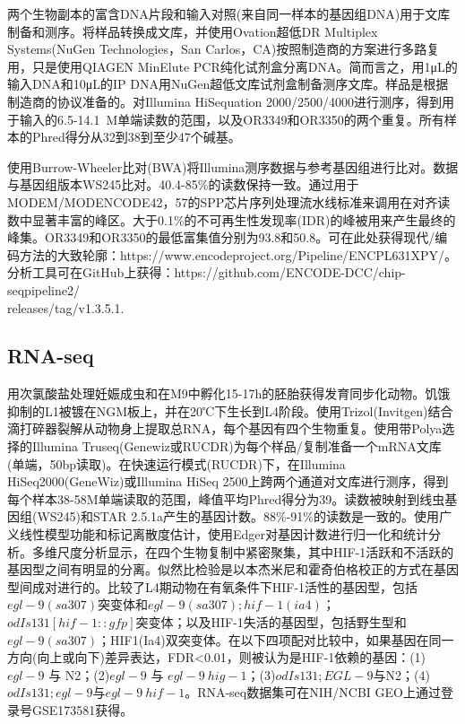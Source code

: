 \documentclass{ctexart}
\begin{document}
        两个生物副本的富含DNA片段和输入对照(来自同一样本的基因组DNA)用于文库制备和测序。将样品转换成文库，并使用Ovation超低DR Multiplex Systems(NuGen Technologies，San Carlos，CA)按照制造商的方案进行多路复用，只是使用QIAGEN MinElute PCR纯化试剂盒分离DNA。简而言之，用1μL的输入DNA和10μL的IP DNA用NuGen超低文库试剂盒制备测序文库。样品是根据制造商的协议准备的。对Illumina HiSequation 2000/2500/4000进行测序，得到用于输入的6.5-14.1~M单端读数的范围，以及OR3349和OR3350的两个重复。所有样本的Phred得分从32到38到至少47个碱基。

        使用Burrow-Wheeler比对(BWA)将Illumina测序数据与参考基因组进行比对。数据与基因组版本WS245比对。40.4-85\%的读数保持一致。通过用于MODEM/MODENCODE42，57的SPP芯片序列处理流水线标准来调用在对齐读数中显著丰富的峰区。大于0.1\%的不可再生性发现率(IDR)的峰被用来产生最终的峰集。OR3349和OR3350的最低富集值分别为93.8和50.8。可在此处获得现代/编码方法的大致轮廓：https://www.encodeproject.org/Pipeline/ENCPL631XPY/。分析工具可在GitHub上获得：https://github.com/ENCODE-DCC/chip-seqpipeline2/\\releases/tag/v1.3.5.1.

        \subsection{RNA-seq}

        用次氯酸盐处理妊娠成虫和在M9中孵化15-17h的胚胎获得发育同步化动物。饥饿抑制的L1被镀在NGM板上，并在20℃下生长到L4阶段。使用Trizol(Invitgen)结合滴打碎器裂解从动物身上提取总RNA，每个基因有四个生物重复。使用带Polya选择的Illumina Truseq(Genewiz或RUCDR)为每个样品/复制准备一个mRNA文库(单端，50bp读取)。在快速运行模式(RUCDR)下，在Illumina HiSeq2000(GeneWiz)或Illumina HiSeq 2500上跨两个通道对文库进行测序，得到每个样本38-58M单端读取的范围，峰值平均Phred得分为39。读数被映射到线虫基因组(WS245)和STAR 2.5.1a产生的基因计数。88\%-91\%的读数是一致的。使用广义线性模型功能和标记离散度估计，使用Edger对基因计数进行归一化和统计分析。多维尺度分析显示，在四个生物复制中紧密聚集，其中HIF-1活跃和不活跃的基因型之间有明显的分离。似然比检验是以本杰米尼和霍奇伯格校正的方式在基因型间成对进行的。比较了L4期动物在有氧条件下HIF-1活性的基因型，包括$egl-9(sa307)$突变体和$egl-9(sa307);hif-1(ia4)$；$odIs131[hif-1::gfp]$突变体；以及HIF-1失活的基因型，包括野生型和$egl-9(sa307)$；HIF1(Ia4)双突变体。在以下四项配对比较中，如果基因在同一方向(向上或向下)差异表达，FDR<0.01，则被认为是HIF-1依赖的基因：(1)$egl-9$ 与 N2；(2)$egl-9$ 与 $egl-9~hig-1$；(3)$odIs131;EGL-9$与N2；(4)$odIs131;egl-9$与$egl-9~hif-1$。RNA-seq数据集可在NIH/NCBI GEO上通过登录号GSE173581获得。
\end{document}
